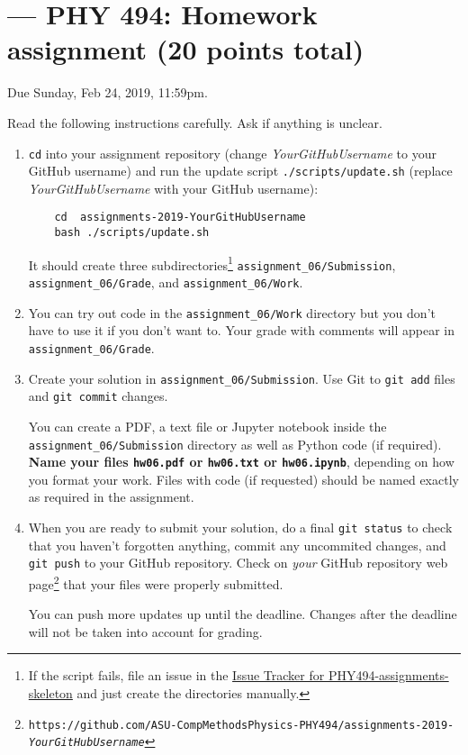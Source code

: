 \documentclass[paper=letter]{scrartcl}
\newcommand{\anumber}{6}
\newcommand{\anum}{0\anumber}
\begin{document}

\setcounter{section}{\anumber}
\addtocounter{section}{-1}
\section{ --- PHY 494: Homework assignment (20 points total)}

\noindent Due Sunday, Feb 24, 2019, 11:59pm.

\noindent
Read the following instructions carefully. Ask if anything is unclear.
\begin{enumerate}
\item \texttt{cd} into your assignment repository (change
  \emph{YourGitHubUsername} to your GitHub username) and run the
  update script \texttt{./scripts/update.sh} (replace
  \emph{YourGitHubUsername} with your GitHub username):
  \begin{verbatim}
    cd  assignments-2019-YourGitHubUsername
    bash ./scripts/update.sh
  \end{verbatim}
  It should create three subdirectories\footnote{If the script fails,
    file an issue in the
    \href{https://github.com/ASU-CompMethodsPhysics-PHY494/PHY494-assignments-skeleton/issues}{Issue
      Tracker for PHY494-assignments-skeleton} and just create the
    directories manually.} \texttt{assignment\_\anum/Submission},
  \texttt{assignment\_\anum/Grade}, and
  \texttt{assignment\_\anum/Work}.
\item You can try out code in the \texttt{assignment\_\anum/Work}
  directory but you don't have to use it if you don't want to. Your
  grade with comments will appear in
  \texttt{assignment\_\anum/Grade}.
\item Create your solution in
  \texttt{assignment\_\anum/Submission}. Use Git to \texttt{git
    add} files and \texttt{git commit} changes.

  You can create a PDF, a text file or Jupyter notebook inside the
  \texttt{assignment\_\anum/Submission} directory as well as Python
  code (if required). \textbf{Name your files \texttt{hw\anum.pdf} or
    \texttt{hw\anum.txt} or \texttt{hw\anum.ipynb}}, depending on how
  you format your work. Files with code (if requested) should be named
  exactly as required in the assignment.
\item When you are ready to submit your solution, do a final
  \texttt{git status} to check that you haven't forgotten anything,
  commit any uncommited changes, and \texttt{git push} to your GitHub
  repository. Check on \emph{your} GitHub repository web
  page\footnote{\texttt{https://github.com/ASU-CompMethodsPhysics-PHY494/assignments-2019-\emph{YourGitHubUsername}}}
  that your files were properly submitted.

  You can push more updates up until the deadline. Changes after the
  deadline will not be taken into account for grading.
\end{enumerate}
\end{document}
